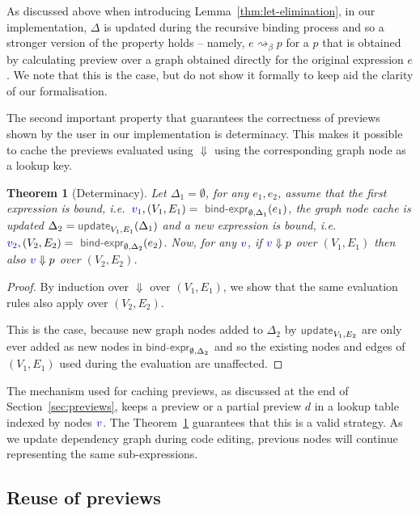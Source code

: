 \documentclass[acmsmall,anonymous,fleqn]{acmart}\settopmatter{printfolios=false,printccs=false,printacmref=false}
\newcounter{thc}
\theoremstyle{plain}
\newtheorem{theorem}[thc]{Theorem}
\theoremstyle{definition}
\newcommand{\ident}[1]{\textnormal{\textcolor{idclr}{\sffamily #1}}}
\newcommand{\bndclr}[1]{\textcolor{kvdclr}{#1}}
\begin{document}
As discussed above when introducing Lemma~\ref{thm:let-elimination}, in our implementation,
$\Delta$ is updated during the recursive binding process and so a stronger version of the property
holds -- namely, $e \rightsquigarrow_\beta p$ for a $p$ that is obtained by calculating preview
over a graph obtained directly for the original expression $e$. We note that this is the case, but
do not show it formally to keep aid the clarity of our formalisation.

The second important property that guarantees the correctness of previews shown by the user in
our implementation is determinacy. This makes it possible to cache the previews evaluated using
$\Downarrow$ using the corresponding graph node as a lookup key.

\begin{theorem}[Determinacy]
\label{thm:determinacy}
Let $\Delta_1 = \emptyset$, for any $e_1, e_2$, assume that the first expression is bound,
i.e.~$\bndclr{v_1}, (V_1, E_1) = \ident{bind-expr}_{\emptyset, \Delta_1}(e_1)$, the graph node cache
is updated $\Delta_2 = \ident{update}_{V_1, E_1}(\Delta_1)$ and a new expression is bound, i.e.~
$\bndclr{v_2}, (V_2, E_2) = \ident{bind-expr}_{\emptyset, \Delta_2}(e_2)$. Now, for any $\bndclr{v}$,
if $\bndclr{v} \Downarrow p$ over $(V_1, E_1)$ then also
 $\bndclr{v} \Downarrow p$ over $(V_2, E_2)$.
\end{theorem}
\begin{proof}
By induction over $\Downarrow$ over $(V_1, E_1)$, we show that the same evaluation rules also
apply over $(V_2, E_2)$.

This is the case, because new graph nodes added to $\Delta_2$ by $\ident{update}_{V_1, E_2}$
are only ever added as new nodes in $\ident{bind-expr}_{\emptyset, \Delta_2}$ and so the existing
nodes and edges of $(V_1, E_1)$ used during the evaluation are unaffected.
\end{proof}

The mechanism used for caching previews, as discussed at the end of Section~\ref{sec:previews},
keeps a preview or a partial preview $d$ in a lookup table indexed by nodes $\bndclr{v}$. The
Theorem~\ref{thm:determinacy} guarantees that this is a valid strategy. As we update dependency
graph during code editing, previous nodes will continue representing the same sub-expressions.


\subsection{Reuse of previews}
\label{sec:properties-reuse}
\end{document}
